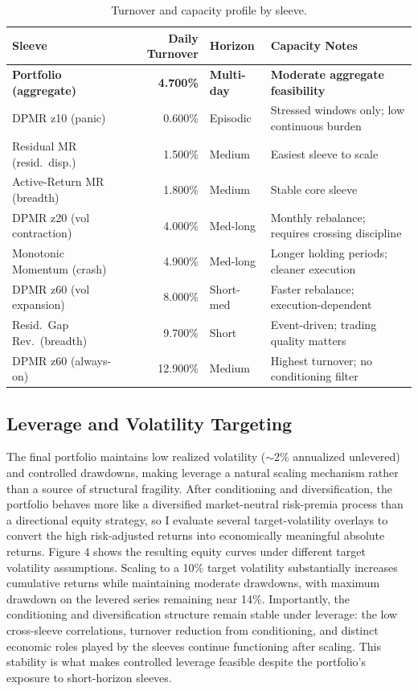 \documentclass{article}
\begin{document}
\begin{table}[htbp]
    \centering
    \small
    \begin{tabular}{lrll}
        \toprule
        Sleeve & Daily Turnover & Horizon & Capacity Notes \\
        \midrule
        \textbf{Portfolio (aggregate)} & \textbf{4.700\%} & \textbf{Multi-day} & \textbf{Moderate aggregate feasibility} \\
        DPMR z10 (panic) & 0.600\% & Episodic & Stressed windows only; low continuous burden \\
        Residual MR (resid.\ disp.) & 1.500\% & Medium & Easiest sleeve to scale \\
        Active-Return MR (breadth) & 1.800\% & Medium & Stable core sleeve \\
        DPMR z20 (vol contraction) & 4.000\% & Med-long & Monthly rebalance; requires crossing discipline \\
        Monotonic Momentum (crash) & 4.900\% & Med-long & Longer holding periods; cleaner execution \\
        DPMR z60 (vol expansion) & 8.000\% & Short-med & Faster rebalance; execution-dependent \\
        Resid.\ Gap Rev.\ (breadth) & 9.700\% & Short & Event-driven; trading quality matters \\
        DPMR z60 (always-on) & 12.900\% & Medium & Highest turnover; no conditioning filter \\
        \bottomrule
    \end{tabular}
    \caption{Turnover and capacity profile by sleeve.}
    \label{tab:turnover-capacity}
\end{table}

\subsection{Leverage and Volatility Targeting}

The final portfolio maintains low realized volatility ($\sim$2\% annualized unlevered) and controlled drawdowns, making leverage a natural scaling mechanism rather than a source of structural fragility. After conditioning and diversification, the portfolio behaves more like a diversified market-neutral risk-premia process than a directional equity strategy, so I evaluate several target-volatility overlays to convert the high risk-adjusted returns into economically meaningful absolute returns. Figure 4 shows the resulting equity curves under different target volatility assumptions. Scaling to a 10\% target volatility substantially increases cumulative returns while maintaining moderate drawdowns, with maximum drawdown on the levered series remaining near 14\%. Importantly, the conditioning and diversification structure remain stable under leverage: the low cross-sleeve correlations, turnover reduction from conditioning, and distinct economic roles played by the sleeves continue functioning after scaling. This stability is what makes controlled leverage feasible despite the portfolio’s exposure to short-horizon sleeves.
\end{document}
